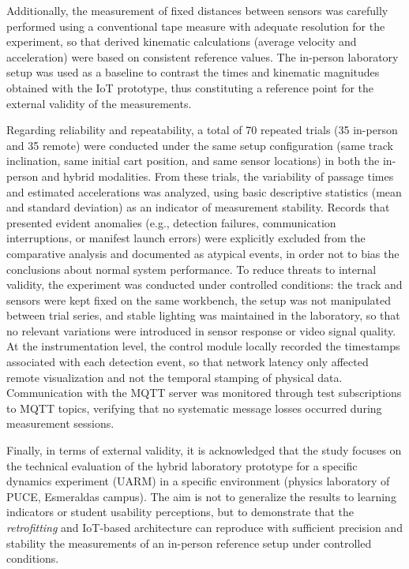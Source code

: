 \documentclass[sensors,article,submit,pdftex]{Definitions/mdpi}
\begin{document}
Additionally, the measurement of fixed distances between sensors was carefully performed using a conventional tape measure with adequate resolution for the experiment, so that derived kinematic calculations (average velocity and acceleration) were based on consistent reference values. The in-person laboratory setup was used as a baseline to contrast the times and kinematic magnitudes obtained with the IoT prototype, thus constituting a reference point for the external validity of the measurements.

Regarding reliability and repeatability, a total of 70 repeated trials (35 in-person and 35 remote) were conducted under the same setup configuration (same track inclination, same initial cart position, and same sensor locations) in both the in-person and hybrid modalities. From these trials, the variability of passage times and estimated accelerations was analyzed, using basic descriptive statistics (mean and standard deviation) as an indicator of measurement stability. Records that presented evident anomalies (e.g., detection failures, communication interruptions, or manifest launch errors) were explicitly excluded from the comparative analysis and documented as atypical events, in order not to bias the conclusions about normal system performance. To reduce threats to internal validity, the experiment was conducted under controlled conditions: the track and sensors were kept fixed on the same workbench, the setup was not manipulated between trial series, and stable lighting was maintained in the laboratory, so that no relevant variations were introduced in sensor response or video signal quality. At the instrumentation level, the control module locally recorded the timestamps associated with each detection event, so that network latency only affected remote visualization and not the temporal stamping of physical data. Communication with the MQTT server was monitored through test subscriptions to MQTT topics, verifying that no systematic message losses occurred during measurement sessions.

Finally, in terms of external validity, it is acknowledged that the study focuses on the technical evaluation of the hybrid laboratory prototype for a specific dynamics experiment (UARM) in a specific environment (physics laboratory of PUCE, Esmeraldas campus). The aim is not to generalize the results to learning indicators or student usability perceptions, but to demonstrate that the \textit{retrofitting} and IoT-based architecture can reproduce with sufficient precision and stability the measurements of an in-person reference setup under controlled conditions.
\end{document}
